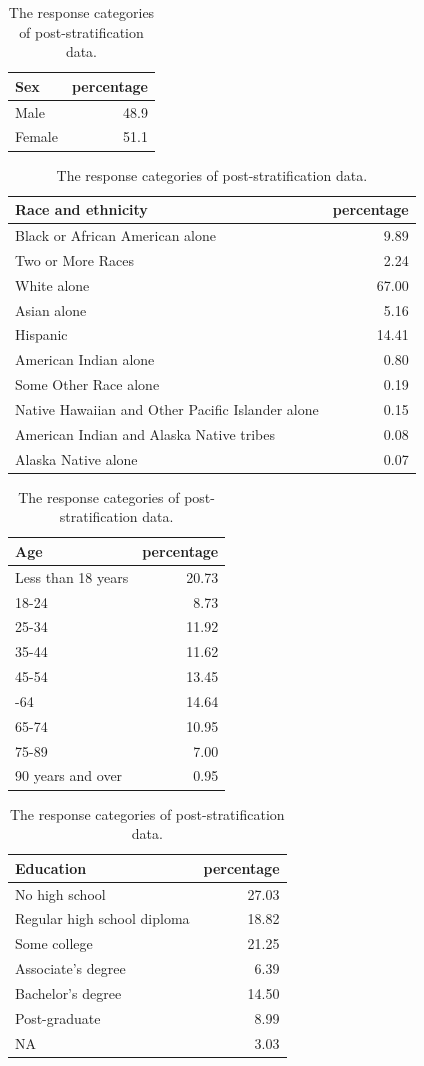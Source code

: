 \documentclass{monashthesis}
\begin{document}
\begin{table}
\caption{\label{tab:acs-response-freq}The response categories of post-stratification data.}

\centering
\begin{tabular}[t]{lr}
\toprule
Sex & percentage\\
\midrule
Male & 48.9\\
Female & 51.1\\
\bottomrule
\end{tabular}
\centering
\begin{tabular}[t]{lr}
\toprule
Race and ethnicity & percentage\\
\midrule
Black or African American alone & 9.89\\
Two or More Races & 2.24\\
White alone & 67.00\\
Asian alone & 5.16\\
Hispanic & 14.41\\
\addlinespace
American Indian alone & 0.80\\
Some Other Race alone & 0.19\\
Native Hawaiian and Other Pacific Islander alone & 0.15\\
American Indian and Alaska Native tribes & 0.08\\
Alaska Native alone & 0.07\\
\bottomrule
\end{tabular}
\centering
\begin{tabular}[t]{lr}
\toprule
Age & percentage\\
\midrule
Less than 18 years & 20.73\\
18-24 & 8.73\\
25-34 & 11.92\\
35-44 & 11.62\\
45-54 & 13.45\\
\addlinespace
55-64 & 14.64\\
65-74 & 10.95\\
75-89 & 7.00\\
90 years and over & 0.95\\
\bottomrule
\end{tabular}
\centering
\begin{tabular}[t]{lr}
\toprule
Education & percentage\\
\midrule
No high school & 27.03\\
Regular high school diploma & 18.82\\
Some college & 21.25\\
Associate's degree & 6.39\\
Bachelor's degree & 14.50\\
\addlinespace
Post-graduate & 8.99\\
NA & 3.03\\
\bottomrule
\end{tabular}
\end{table}
\end{document}

